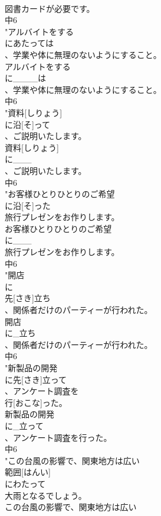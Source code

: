 \documentclass[8pt]{extreport}
\begin{document}
\begin{CJK}{UTF8}{min}
\\	図書カードが必要です。
\\	中6
\\	"アルバイトをする
\\	にあたっては
\\	、学業や体に無理のないようにすること。
\\	アルバイトをする
\\	に____は
\\	、学業や体に無理のないようにすること。
\\	中6
\\	"資料[しりょう]
\\	に沿[そ]って
\\	、ご説明いたします。
\\	資料[しりょう]
\\	に___
\\	、ご説明いたします。
\\	中6
\\	"お客様ひとりひとりのご希望
\\	に沿[そ]った
\\	旅行プレゼンをお作りします。
\\	お客様ひとりひとりのご希望
\\	に___
\\	旅行プレゼンをお作りします。
\\	中6
\\	"開店
\\	に
\\	先[さき]立ち
\\	、関係者だけのパーティーが行われた。
\\	開店
\\	に_立ち
\\	、関係者だけのパーティーが行われた。
\\	中6
\\	"新製品の開発
\\	に先[さき]立って
\\	、アンケート調査を
\\	行[おこな]った。
\\	新製品の開発
\\	に_立って
\\	、アンケート調査を行った。
\\	中6
\\	"この台風の影響で、関東地方は広い
\\	範囲[はんい]
\\	にわたって
\\	大雨となるでしょう。
\\	この台風の影響で、関東地方は広い

\end{CJK}
\end{document}
